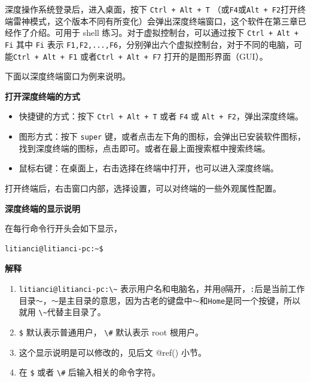 \documentclass[doctor,openright,twoside]{sjtuthesis}
\providecommand{\tightlist}{%
    \setlength{\itemsep}{0pt}\setlength{\parskip}{0pt}}
\newcommand{\passthrough}[1]{#1}
\theoremstyle{plain}
\theoremstyle{definition}
\theoremstyle{remark}
\theoremstyle{ocrenumbox}
\theoremstyle{plain}
\begin{document}
深度操作系统登录后，进入桌面，按下 \passthrough{\lstinline!Ctrl + Alt + T!} （或\passthrough{\lstinline!F4!}或\passthrough{\lstinline!Alt + F2!}打开终端雷神模式，这个版本不同有所变化）会弹出深度终端窗口，这个软件在第三章已经作了介绍。可用于 shell 练习。对于虚拟控制台，可以通过按下 \passthrough{\lstinline!Ctrl + Alt + Fi!} 其中 \passthrough{\lstinline!Fi!} 表示 \passthrough{\lstinline!F1,F2,...,F6!}，分别弹出六个虚拟控制台，对于不同的电脑，可能\passthrough{\lstinline!Ctrl + Alt + F1!} 或者\passthrough{\lstinline!Ctrl + Alt + F7!} 打开的是图形界面（GUI）。

下面以深度终端窗口为例来说明。

\textbf{打开深度终端的方式}

\begin{itemize}
\tightlist
\item
  快捷键的方式：按下 \passthrough{\lstinline!Ctrl + Alt + T!} 或者 \passthrough{\lstinline!F4!} 或 \passthrough{\lstinline!Alt + F2!}，弹出深度终端。
\item
  图形方式：按下 \passthrough{\lstinline!super!} 键，或者点击左下角的图标，会弹出已安装软件图标，找到深度终端的图标，点击即可。或者在最上面搜索框中搜索终端。
\item
  鼠标右键：在桌面上，右击选择在终端中打开，也可以进入深度终端。
\end{itemize}

打开终端后，右击窗口内部，选择设置，可以对终端的一些外观属性配置。

\textbf{深度终端的显示说明}

在每行命令行开头会如下显示，

\begin{lstlisting}[language=bash]
litianci@litianci-pc:~$ 
\end{lstlisting}

\textbf{解释}

\begin{enumerate}
\def\labelenumi{\arabic{enumi}.}
\tightlist
\item
  \passthrough{\lstinline!litianci@litianci-pc:\~!} 表示用户名和电脑名，并用\passthrough{\lstinline!@!}隔开，\passthrough{\lstinline!:!}后是当前工作目录\passthrough{\lstinline!～!}，\passthrough{\lstinline!～!}是主目录的意思，因为古老的键盘中\passthrough{\lstinline!～!}和\passthrough{\lstinline!Home!}是同一个按键，所以就用 \passthrough{\lstinline!\~!}代替主目录了。
\item
  \passthrough{\lstinline!$!} 默认表示普通用户， \passthrough{\lstinline!\#!} 默认表示 root 根用户。
\item
  这个显示说明是可以修改的，见后文 @ref() 小节。
\item
  在 \passthrough{\lstinline!$!} 或者 \passthrough{\lstinline!\#!} 后输入相关的命令字符。
\end{enumerate}
\end{document}
